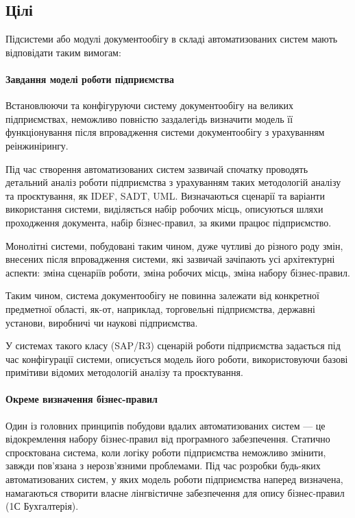 \documentclass{memoir}
\begin{document}
\subsection{Цілі}

Підсистеми або модулі документообігу в складі автоматизованих систем мають відповідати таким вимогам:

\paragraph{Завдання моделі роботи підприємства}

Встановлюючи та конфігуруючи систему документообігу на великих підприємствах, неможливо повністю заздалегідь визначити модель її функціонування після впровадження системи документообігу з урахуванням реінжинірингу.

Під час створення автоматизованих систем зазвичай спочатку проводять детальний аналіз роботи підприємства з урахуванням таких методологій аналізу та проєктування, як IDEF, SADT, UML. Визначаються сценарії та варіанти використання системи, виділяється набір робочих місць, описуються шляхи проходження документа, набір бізнес-правил, за якими працює підприємство.

Монолітні системи, побудовані таким чином, дуже чутливі до різного роду змін, внесених після впровадження системи, які зазвичай зачіпають усі архітектурні аспекти: зміна сценаріїв роботи, зміна робочих місць, зміна набору бізнес-правил.

Таким чином, система документообігу не повинна залежати від конкретної предметної області, як-от, наприклад, торговельні підприємства, державні установи, виробничі чи наукові підприємства.

У системах такого класу (SAP/R3) сценарій роботи підприємства задається під час конфігурації системи, описується модель його роботи, використовуючи базові примітиви відомих методологій аналізу та проєктування.

\paragraph{Окреме визначення бізнес-правил}

Один із головних принципів побудови вдалих автоматизованих систем — це відокремлення набору бізнес-правил від програмного забезпечення. Статично спроєктована система, коли логіку роботи підприємства неможливо змінити, завжди пов’язана з нерозв’язними проблемами. Під час розробки будь-яких автоматизованих систем, у яких модель роботи підприємства наперед визначена, намагаються створити власне лінгвістичне забезпечення для опису бізнес-правил (1С Бухгалтерія).
\end{document}
